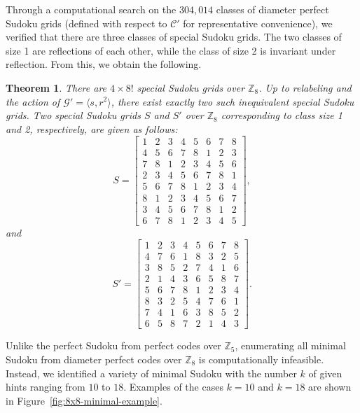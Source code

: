 \documentclass{article}
\newtheorem{theorem}{Theorem}[section]
\theoremstyle{definition}
\begin{document}
Through a computational search on the $304,014$ classes of diameter perfect Sudoku grids (defined with respect to $\mathcal{C}'$ for representative convenience), we verified that there are three classes of special Sudoku grids. The two classes of size 1 are reflections of each other, while the class of size 2 is invariant under reflection. From this, we obtain the following.
\begin{theorem}
    There are $4\times 8!$ special Sudoku grids over $\mathbb{Z}_8$. Up to relabeling and the action of $\mathcal{G}'=\langle s, r^2\rangle$, there exist exactly two such inequivalent special Sudoku grids. Two special Sudoku grids $S$ and $S'$ over $\mathbb{Z}_8$ corresponding to class size 1 and 2, respectively, are given as follows:
    \[
S=\begin{bmatrix}
1 & 2 & 3 & 4 & 5 & 6 & 7 & 8\\
4 & 5 & 6 & 7 & 8 & 1 & 2 & 3\\
7 & 8 & 1 & 2 & 3 & 4 & 5 & 6\\
2 & 3 & 4 & 5 & 6 & 7 & 8 & 1\\
5 & 6 & 7 & 8 & 1 & 2 & 3 & 4\\
8 & 1 & 2 & 3 & 4 & 5 & 6 & 7\\
3 & 4 & 5 & 6 & 7 & 8 & 1 & 2\\
6 & 7 & 8 & 1 & 2 & 3 & 4 & 5
\end{bmatrix},
\]
and
\[
S'=\begin{bmatrix}
1 & 2 & 3 & 4 & 5 & 6 & 7 & 8\\
4 & 7 & 6 & 1 & 8 & 3 & 2 & 5\\
3 & 8 & 5 & 2 & 7 & 4 & 1 & 6\\
2 & 1 & 4 & 3 & 6 & 5 & 8 & 7\\
5 & 6 & 7 & 8 & 1 & 2 & 3 & 4\\
8 & 3 & 2 & 5 & 4 & 7 & 6 & 1\\
7 & 4 & 1 & 6 & 3 & 8 & 5 & 2\\
6 & 5 & 8 & 7 & 2 & 1 & 4 & 3
\end{bmatrix}.
\]
\end{theorem}

Unlike the perfect Sudoku from perfect codes over $\mathbb{Z}_5$, enumerating all minimal Sudoku from
diameter perfect codes over $\mathbb{Z}_8$ is computationally infeasible. Instead, we identified a variety of minimal Sudoku with the number $k$ of given hints ranging from $10$ to $18$. Examples of the cases $k=10$ and $k=18$ are shown in Figure~\ref{fig:8x8-minimal-example}.
\end{document}
